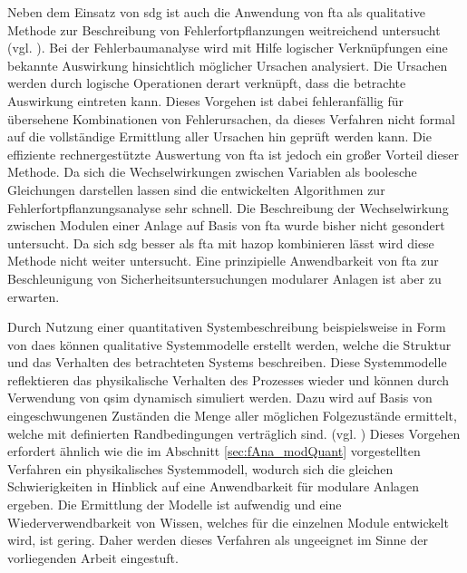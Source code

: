 Neben dem Einsatz von \ac{sdg} ist auch die Anwendung von \ac{fta} als qualitative Methode zur Beschreibung von Fehlerfortpflanzungen weitreichend untersucht {(vgl. \cite[S. 6]{Venkatasubramanian_2003a})}. Bei der Fehlerbaumanalyse wird mit Hilfe logischer Verkn\"upfungen eine bekannte Auswirkung hinsichtlich m\"oglicher Ursachen analysiert. Die Ursachen werden durch logische Operationen derart verkn\"upft, dass die betrachte Auswirkung eintreten kann. Dieses Vorgehen ist dabei fehleranf\"allig f\"ur \"ubersehene Kombinationen von Fehlerursachen, da dieses Verfahren nicht formal auf die vollst\"andige Ermittlung aller Ursachen hin gepr\"uft werden kann. Die effiziente rechnergest\"utzte Auswertung von \ac{fta} ist jedoch ein gro\ss{}er Vorteil dieser Methode. Da sich die Wechselwirkungen zwischen Variablen als boolesche Gleichungen darstellen lassen sind die entwickelten Algorithmen zur Fehlerfortpflanzungsanalyse sehr schnell. \newline
Die Beschreibung der Wechselwirkung zwischen Modulen einer Anlage auf Basis von \ac{fta} wurde bisher nicht gesondert untersucht. Da sich \ac{sdg} besser als \ac{fta} mit \ac{hazop} kombinieren l\"asst wird diese Methode nicht weiter untersucht. Eine prinzipielle Anwendbarkeit von \ac{fta} zur Beschleunigung von Sicherheitsuntersuchungen modularer Anlagen ist aber zu erwarten. 

Durch Nutzung einer quantitativen Systembeschreibung beispielsweise in Form von \acp{dae} k\"onnen qualitative Systemmodelle erstellt werden, welche die Struktur und das Verhalten des betrachteten Systems beschreiben. Diese Systemmodelle reflektieren das physikalische Verhalten des Prozesses wieder und k\"onnen durch Verwendung von \ac{qsim} dynamisch simuliert werden. Dazu wird auf Basis von eingeschwungenen Zust\"anden die Menge aller m\"oglichen Folgezust\"ande ermittelt, welche mit definierten Randbedingungen vertr\"aglich sind. {(vgl. \cite[S. 6 ff.]{Venkatasubramanian_2003a})} \newline
Dieses Vorgehen erfordert \"ahnlich wie die im Abschnitt \ref{sec:fAna_modQuant} vorgestellten Verfahren ein physikalisches Systemmodell, wodurch sich die gleichen Schwierigkeiten in Hinblick auf eine Anwendbarkeit f\"ur modulare Anlagen ergeben. Die Ermittlung der Modelle ist aufwendig und eine Wiederverwendbarkeit von Wissen, welches f\"ur die einzelnen Module entwickelt wird, ist gering. Daher werden dieses Verfahren als ungeeignet im Sinne der vorliegenden Arbeit eingestuft.  

